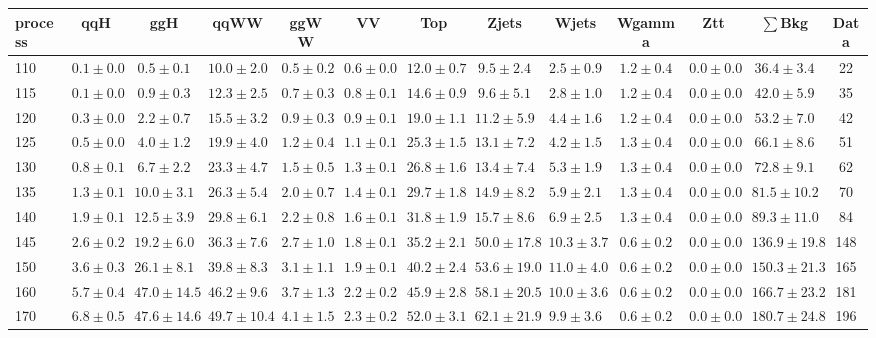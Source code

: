 \begin{table}
{%
 \tiny
 \begin{center}
 \begin{tabular}{l | c c | c c c c c c c c  | c c}
 \hline
 process & qqH & ggH & qqWW & ggWW & VV & Top & Zjets & Wjets & Wgamma & Ztt & $\sum$Bkg & Data \\
 \hline
110 & $0.1\pm0.0$ & $0.5\pm0.1$ & $10.0\pm2.0$ & $0.5\pm0.2$ & $0.6\pm0.0$ & $12.0\pm0.7$ & $9.5\pm2.4$ & $2.5\pm0.9$ & $1.2\pm0.4$ & $0.0\pm0.0$ & $36.4\pm3.4$ & 22 \\
115 & $0.1\pm0.0$ & $0.9\pm0.3$ & $12.3\pm2.5$ & $0.7\pm0.3$ & $0.8\pm0.1$ & $14.6\pm0.9$ & $9.6\pm5.1$ & $2.8\pm1.0$ & $1.2\pm0.4$ & $0.0\pm0.0$ & $42.0\pm5.9$ & 35 \\
120 & $0.3\pm0.0$ & $2.2\pm0.7$ & $15.5\pm3.2$ & $0.9\pm0.3$ & $0.9\pm0.1$ & $19.0\pm1.1$ & $11.2\pm5.9$ & $4.4\pm1.6$ & $1.2\pm0.4$ & $0.0\pm0.0$ & $53.2\pm7.0$ & 42 \\
125 & $0.5\pm0.0$ & $4.0\pm1.2$ & $19.9\pm4.0$ & $1.2\pm0.4$ & $1.1\pm0.1$ & $25.3\pm1.5$ & $13.1\pm7.2$ & $4.2\pm1.5$ & $1.3\pm0.4$ & $0.0\pm0.0$ & $66.1\pm8.6$ & 51 \\
130 & $0.8\pm0.1$ & $6.7\pm2.2$ & $23.3\pm4.7$ & $1.5\pm0.5$ & $1.3\pm0.1$ & $26.8\pm1.6$ & $13.4\pm7.4$ & $5.3\pm1.9$ & $1.3\pm0.4$ & $0.0\pm0.0$ & $72.8\pm9.1$ & 62 \\
135 & $1.3\pm0.1$ & $10.0\pm3.1$ & $26.3\pm5.4$ & $2.0\pm0.7$ & $1.4\pm0.1$ & $29.7\pm1.8$ & $14.9\pm8.2$ & $5.9\pm2.1$ & $1.3\pm0.4$ & $0.0\pm0.0$ & $81.5\pm10.2$ & 70 \\
140 & $1.9\pm0.1$ & $12.5\pm3.9$ & $29.8\pm6.1$ & $2.2\pm0.8$ & $1.6\pm0.1$ & $31.8\pm1.9$ & $15.7\pm8.6$ & $6.9\pm2.5$ & $1.3\pm0.4$ & $0.0\pm0.0$ & $89.3\pm11.0$ & 84 \\
145 & $2.6\pm0.2$ & $19.2\pm6.0$ & $36.3\pm7.6$ & $2.7\pm1.0$ & $1.8\pm0.1$ & $35.2\pm2.1$ & $50.0\pm17.8$ & $10.3\pm3.7$ & $0.6\pm0.2$ & $0.0\pm0.0$ & $136.9\pm19.8$ & 148 \\
150 & $3.6\pm0.3$ & $26.1\pm8.1$ & $39.8\pm8.3$ & $3.1\pm1.1$ & $1.9\pm0.1$ & $40.2\pm2.4$ & $53.6\pm19.0$ & $11.0\pm4.0$ & $0.6\pm0.2$ & $0.0\pm0.0$ & $150.3\pm21.3$ & 165 \\
160 & $5.7\pm0.4$ & $47.0\pm14.5$ & $46.2\pm9.6$ & $3.7\pm1.3$ & $2.2\pm0.2$ & $45.9\pm2.8$ & $58.1\pm20.5$ & $10.0\pm3.6$ & $0.6\pm0.2$ & $0.0\pm0.0$ & $166.7\pm23.2$ & 181 \\
170 & $6.8\pm0.5$ & $47.6\pm14.6$ & $49.7\pm10.4$ & $4.1\pm1.5$ & $2.3\pm0.2$ & $52.0\pm3.1$ & $62.1\pm21.9$ & $9.9\pm3.6$ & $0.6\pm0.2$ & $0.0\pm0.0$ & $180.7\pm24.8$ & 196 \\

\end{tabular}
\end{center}}
\end{table}
